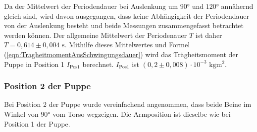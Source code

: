       Da der Mittelwert der Periodendauer bei Auslenkung um $90$° und $120$° annähernd gleich sind, wird davon ausgegangen, dass keine Abhängigkeit der 
      Periodendauer von der Auslenkung besteht und beide Messungen zusammengefasst betrachtet werden können. 
      Der allgemeine Mittelwert der Periodenauer $T$ ist daher $T = 0,614 \pm 0,004\,\, \unit{\second}$. 
      Mithilfe dieses Mittelwertes und Formel (\ref{eqn:TragheitmomentAusSchwingungsdauer}) wird das 
      Trägheitsmoment der Puppe in Position 1 $I_{\text{Pos1}}$ berechnet. 
      $I_{\text{Pos1}}$ ist $(0,2 \pm 0,008) \cdot 10^{-3}\,\, \unit{\kilo\gram\meter\squared}$.
            
    \subsubsection{Position 2 der Puppe}
    Bei Position 2 der Puppe wurde vereinfachend angenommen, dass beide Beine im Winkel von $90$° vom Torso wegzeigen. 
    Die Armposition ist dieselbe wie bei Position 1 der Puppe.\\
    \\
    
